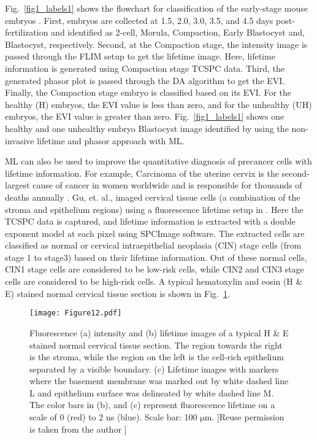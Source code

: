 \documentclass[12pt]{iopart}
\begin{document}
Fig.~\ref{fig1_labels1} shows the flowchart for classification of the early-stage mouse embryos \cite{label}. First, embryos are collected at 1.5, 2.0, 3.0, 3.5, and 4.5 days post-fertilization and identified as 2-cell, Morula, Compaction, Early Blastocyst and, Blastocyst, respectively. Second, at the Compaction stage, the intensity image is passed through the FLIM setup to get the lifetime image. Here, lifetime information is generated using Compaction stage TCSPC data. Third, the generated phasor plot is passed through the DA algorithm to get the EVI. Finally, the Compaction stage embryo is classified based on its EVI. For the healthy (H) embryos, the EVI value is less than zero, and for the unhealthy (UH) embryos, the EVI value is greater than zero. Fig.~\ref{fig1_labels1} shows one healthy and one unhealthy embryo Blastocyst image identified by using the non-invasive lifetime and phasor approach with ML. 

ML can also be used to improve the quantitative diagnosis of precancer cells with lifetime information. For example, Carcinoma of the uterine cervix is the second-largest cause of cancer in women worldwide and is responsible for thousands of deaths annually \cite{cancer_intro}. Gu, et. al., imaged cervical tissue cells (a combination of the stroma and epithelium regions) using a fluorescence lifetime setup in \cite{cancer1}. Here the TCSPC data is captured, and lifetime information is extracted with a double exponent model at each pixel using SPCImage software. The extracted cells are classified as normal or cervical intraepithelial neoplasia (CIN) stage cells (from stage 1 to stage3) based on their lifetime information. Out of these normal cells, CIN1 stage cells are considered to be low-risk cells, while CIN2 and CIN3 stage cells are considered to be high-risk cells. A typical hematoxylin and eosin (H \& E) stained normal cervical tissue section is shown in Fig.~\ref{fig1_cancer}.

\begin{figure}[!t]
\centering
\texttt{[image: Figure12.pdf]}
\caption{Fluorescence (a) intensity and (b) lifetime images of a typical H \& E stained normal cervical tissue section. The region towards the right is the stroma, while the region on the left is the cell-rich epithelium separated by a visible boundary. (c) Lifetime images with markers where the basement membrane was marked out by white dashed line L and epithelium surface was delineated by white dashed line M. The color bars in (b), and (c) represent fluorescence lifetime on a scale of 0 (red) to 2 ns (blue). Scale bar: 100 $\mathrm{\mu}$m. [Reuse permission is taken from the author \cite{cancer1,cancer2}]}\label{fig1_cancer}
\end{figure}
\end{document}
